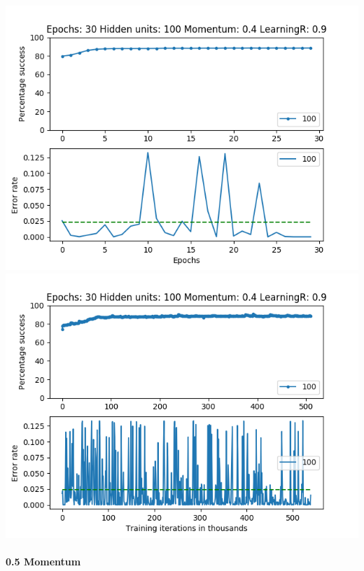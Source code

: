 \documentclass[11pt]{article}
\makeatletter
\def\maxwidth{\ifdim\Gin@nat@width>\linewidth\linewidth
    \else\Gin@nat@width\fi}
\let\Oldincludegraphics\includegraphics
\renewcommand{\includegraphics}[1]{\Oldincludegraphics[width=.8\maxwidth]{#1}}
\makeatother
\begin{document}
\includegraphics{Experiment2/E2_NN_Epoch_Momentum_0.4_30Epochs_100Hiddenunits.png}
\includegraphics{Experiment2/E2_NN_Training_Momentum_0.4_30Epochs_100Hiddenunits.png}

\hypertarget{momentum-5}{%
\paragraph{0.5 Momentum}\label{momentum-5}}
\end{document}
